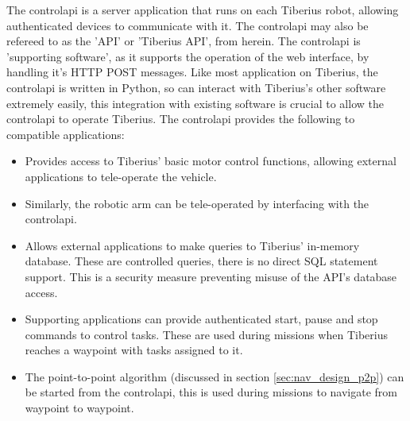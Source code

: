 The \gls{controlapi} is a server application that runs on each Tiberius robot, allowing authenticated devices to communicate with it. The \gls{controlapi} may also be refereed to as the 'API' or 'Tiberius API', from herein. The \gls{controlapi} is 'supporting software', as it supports the operation of the web interface, by handling it's \gls{HTTP} \gls{POST} messages. Like most application on Tiberius, the \gls{controlapi} is written in Python, so can interact with Tiberius's other software extremely easily, this integration with existing software is crucial to allow the \gls{controlapi} to operate Tiberius. The \gls{controlapi} provides the following to compatible applications:

\begin{itemize}
\item Provides access to Tiberius' basic motor control functions, allowing external applications to tele-operate the vehicle.

\item Similarly, the robotic arm can be tele-operated by interfacing with the \gls{controlapi}.

\item Allows external applications to make queries to Tiberius' in-memory database. These are controlled queries, there is no direct SQL statement support. This is a security measure preventing misuse of the API's database access.

\item Supporting applications can provide authenticated start, pause and stop commands to control tasks. These are used during missions when Tiberius reaches a waypoint with tasks assigned to it.

\item The point-to-point algorithm (discussed in section \ref{sec:nav_design_p2p}) can be started from the \gls{controlapi}, this is used during missions to navigate from waypoint to waypoint.

\end{itemize}

